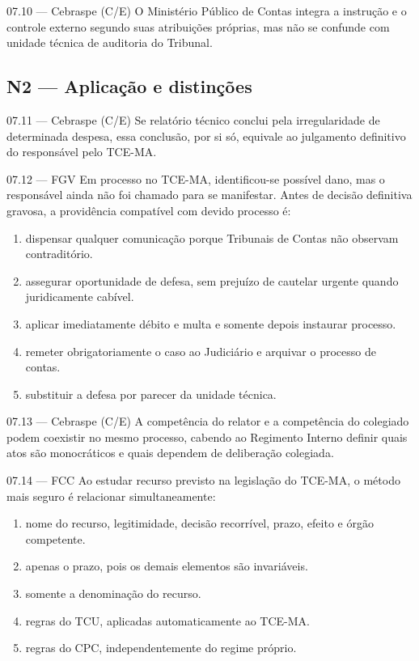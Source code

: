 \begin{questao}{ 07.10 — Cebraspe (C/E)}
O Ministério Público de Contas integra a instrução e o controle externo segundo suas atribuições próprias, mas não se confunde com unidade técnica de auditoria do Tribunal.
\end{questao}

\subsection*{N2 — Aplicação e distinções}

\begin{questao}{ 07.11 — Cebraspe (C/E)}
Se relatório técnico conclui pela irregularidade de determinada despesa, essa conclusão, por si só, equivale ao julgamento definitivo do responsável pelo TCE-MA.
\end{questao}

\begin{questao}{ 07.12 — FGV}
Em processo no TCE-MA, identificou-se possível dano, mas o responsável ainda não foi chamado para se manifestar. Antes de decisão definitiva gravosa, a providência compatível com devido processo é:
\begin{enumerate}[label=\Alph*)]
\item dispensar qualquer comunicação porque Tribunais de Contas não observam contraditório.
\item assegurar oportunidade de defesa, sem prejuízo de cautelar urgente quando juridicamente cabível.
\item aplicar imediatamente débito e multa e somente depois instaurar processo.
\item remeter obrigatoriamente o caso ao Judiciário e arquivar o processo de contas.
\item substituir a defesa por parecer da unidade técnica.
\end{enumerate}
\end{questao}

\begin{questao}{ 07.13 — Cebraspe (C/E)}
A competência do relator e a competência do colegiado podem coexistir no mesmo processo, cabendo ao Regimento Interno definir quais atos são monocráticos e quais dependem de deliberação colegiada.
\end{questao}

\begin{questao}{ 07.14 — FCC}
Ao estudar recurso previsto na legislação do TCE-MA, o método mais seguro é relacionar simultaneamente:
\begin{enumerate}[label=\Alph*)]
\item nome do recurso, legitimidade, decisão recorrível, prazo, efeito e órgão competente.
\item apenas o prazo, pois os demais elementos são invariáveis.
\item somente a denominação do recurso.
\item regras do TCU, aplicadas automaticamente ao TCE-MA.
\item regras do CPC, independentemente do regime próprio.
\end{enumerate}
\end{questao}

